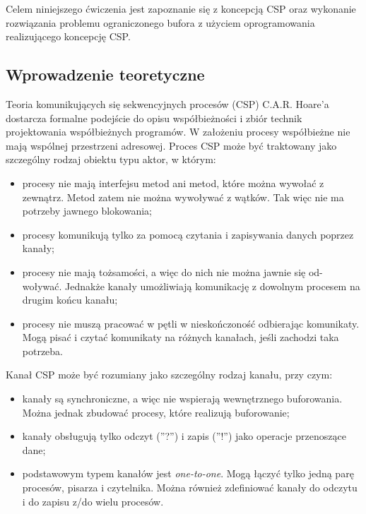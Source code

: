 \documentclass[11pt]{article}
\begin{document}
Celem niniejszego ćwiczenia jest zapoznanie się z koncepcją CSP oraz
wykonanie rozwiązania problemu ograniczonego bufora z użyciem
oprogramowania realizującego koncepcję CSP.

    \hypertarget{wprowadzenie-teoretyczne}{%
\subsection{Wprowadzenie teoretyczne}\label{wprowadzenie-teoretyczne}}

Teoria komunikujących się sekwencyjnych procesów (CSP) C.A.R. Hoare'a
dostarcza formalne podejście do opisu współbieżności i zbiór technik
projektowania współbieżnych programów. W założeniu procesy współbieżne
nie mają wspólnej przestrzeni adresowej. Proces CSP może być traktowany
jako szczególny rodzaj obiektu typu aktor, w którym:

\begin{itemize}
\item
  procesy nie mają interfejsu metod ani metod, które można wywołać z
  zewnątrz. Metod zatem nie można wywoływać z wątków. Tak więc nie ma
  potrzeby jawnego blokowania;
\item
  procesy komunikują tylko za pomocą czytania i zapisywania danych
  poprzez kanały;
\item
  procesy nie mają tożsamości, a więc do nich nie można jawnie się od-
  woływać. Jednakże kanały umożliwiają komunikację z dowolnym procesem
  na drugim końcu kanału;
\item
  procesy nie muszą pracować w pętli w nieskończoność odbierając
  komunikaty. Mogą pisać i czytać komunikaty na różnych kanałach, jeśli
  zachodzi taka potrzeba.
\end{itemize}

Kanał CSP może być rozumiany jako szczególny rodzaj kanału, przy czym:

\begin{itemize}
\item
  kanały są synchroniczne, a więc nie wspierają wewnętrznego
  buforowania. Można jednak zbudować procesy, które realizują
  buforowanie;
\item
  kanały obsługują tylko odczyt (''?'') i zapis (''!'') jako operacje
  przenoszące dane;
\item
  podstawowym typem kanałów jest \emph{one-to-one}. Mogą łączyć tylko
  jedną parę procesów, pisarza i czytelnika. Można również zdefiniować
  kanały do odczytu i do zapisu z/do wielu procesów.
\end{itemize}
\end{document}
